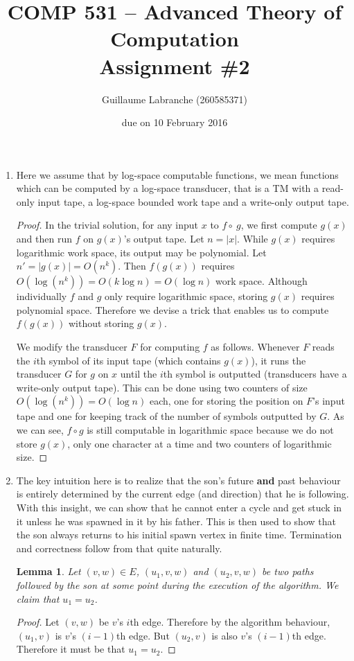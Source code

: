 \documentclass{article}
\author{Guillaume Labranche (260585371)}
\title{COMP 531 -- Advanced Theory of Computation\\Assignment \#2}
\date{due on 10 February 2016}
\newtheorem{lemma}{Lemma}
\begin{document}
\maketitle

\begin{enumerate}

\item Here we assume that by log-space computable functions, we mean functions which can be computed by a log-space transducer, that is a TM with a read-only input tape, a log-space bounded work tape and a write-only output tape.

\begin{proof} In the trivial solution, for any input $x$ to $f \circ\ g$, we first compute $g(x)$ and then run $f$ on $g(x)$'s output tape. Let $n=|x|$. While $g(x)$ requires logarithmic work space, its output may be polynomial. Let $n' = |g(x)| = O(n^k)$. Then $f(g(x))$ requires $O(\log(n^k)) = O(k \log n) = O(\log n)$ work space. Although individually $f$ and $g$ only require logarithmic space, storing $g(x)$ requires polynomial space. Therefore we devise a trick that enables us to compute $f(g(x))$ without storing $g(x)$.

We modify the transducer $F$ for computing $f$ as follows. Whenever $F$ reads the $i$th symbol of its input tape (which contains $g(x)$), it runs the transducer $G$ for $g$ on $x$ until the $i$th symbol is outputted (transducers have a write-only output tape). This can be done using two counters of size $O(\log(n^k))=O(\log n)$ each, one for storing the position on $F$'s input tape and one for keeping track of the number of symbols outputted by $G$. As we can see, $f \circ g$ is still computable in logarithmic space because we do not store $g(x)$, only one character at a time and two counters of logarithmic size.
\end{proof}

\newpage
\item The key intuition here is to realize that the son's future \textbf{and} past behaviour is entirely determined by the current edge (and direction) that he is following. With this insight, we can show that he cannot enter a cycle and get stuck in it unless he was spawned in it by his father. This is then used to show that the son always returns to his initial spawn vertex in finite time. Termination and correctness follow from that quite naturally.

\begin{lemma}\label{lemma_deter}
Let $(v,w)\in E$, $(u_1,v,w)$ and $(u_2,v,w)$ be two paths followed by the son at some point during the execution of the algorithm. We claim that $u_1=u_2$.
\end{lemma}
\begin{proof}
Let $(v,w)$ be $v$'s $i$th edge. Therefore by the algorithm behaviour, $(u_1,v)$ is $v$'s $(i-1)$th edge. But $(u_2,v)$ is also $v$'s $(i-1)$th edge. Therefore it must be that $u_1=u_2$.
\end{proof}


\end{enumerate}
\end{document}
